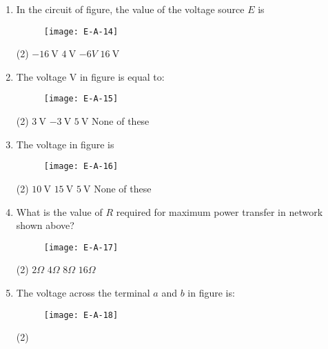 \begin{enumerate}
\begin{tasks}
	\end{tasks}
	\item In the circuit of figure, the value of the voltage source $E$ is
	\begin{figure}[H]
		\centering
		\texttt{[image: E-A-14]}
		\caption{}
		\label{}
	\end{figure}
	 \begin{tasks}(2)
		\task[\textbf{a.}]$-16 \mathrm{~V}$
		\task[\textbf{b.}]$4 \mathrm{~V}$
		\task[\textbf{c.}] $-6 V$
		\task[\textbf{d.}]  $16 \mathrm{~V}$
	\end{tasks}
	\item The voltage $\mathrm{V}$ in figure is equal to:
	\begin{figure}[H]
		\centering
		\texttt{[image: E-A-15]}
		\caption{}
		\label{}
	\end{figure}
	 \begin{tasks}(2)
		\task[\textbf{a.}]$3 \mathrm{~V}$
		\task[\textbf{b.}]$-3 \mathrm{~V}$
		\task[\textbf{c.}]$5 \mathrm{~V}$
		\task[\textbf{d.}]None of these 
	\end{tasks}
	\item The voltage in figure is
	\begin{figure}[H]
		\centering
		\texttt{[image: E-A-16]}
		\caption{}
		\label{}
	\end{figure}
	 \begin{tasks}(2)
		\task[\textbf{a.}]$10 \mathrm{~V}$
		\task[\textbf{b.}]$15 \mathrm{~V}$
		\task[\textbf{c.}]$5 \mathrm{~V}$
		\task[\textbf{d.}]None of these 
	\end{tasks}
\item What is the value of $R$ required for maximum power transfer in network shown above?
\begin{figure}[H]
	\centering
	\texttt{[image: E-A-17]}
	\caption{}
	\label{}
\end{figure}
 \begin{tasks}(2)
	\task[\textbf{a.}]$2\Omega$
	\task[\textbf{b.}]$4\Omega$
	\task[\textbf{c.}]$8\Omega$
	\task[\textbf{d.}]$16\Omega$
\end{tasks}
\item The voltage across the terminal $a$ and $b$ in figure is:
\begin{figure}[H]
	\centering
	\texttt{[image: E-A-18]}
	\caption{}
	\label{}
\end{figure}
 \begin{tasks}(2)

\end{tasks}
\end{enumerate}

